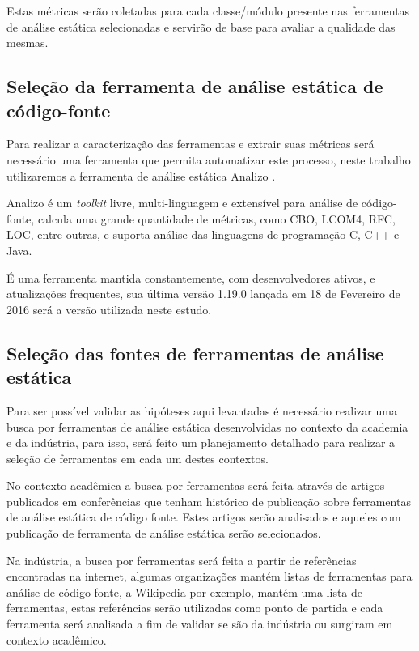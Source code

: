 \documentclass[qual, classic, a4paper]{ufbathesis}
\begin{document}
Estas métricas serão coletadas para cada classe/módulo presente nas
ferramentas de análise estática selecionadas e servirão de base para
avaliar a qualidade das mesmas.

\subsection{Seleção da ferramenta de análise estática de código-fonte}

Para realizar a caracterização das ferramentas e extrair suas métricas
será necessário uma ferramenta que permita automatizar este
processo, neste trabalho utilizaremos a ferramenta de análise estática Analizo
\cite{Terceiro2010}.

Analizo é um {\it toolkit} livre, multi-linguagem e extensível para análise de
código-fonte, calcula uma grande quantidade de métricas, como CBO, LCOM4, RFC,
LOC, entre outras, e suporta análise das linguagens de programação C, C++ e
Java.

É uma ferramenta mantida constantemente, com desenvolvedores ativos, e
atualizações frequentes, sua última versão 1.19.0 lançada em 18 de Fevereiro
de 2016 será a versão utilizada neste estudo.


\subsection{Seleção das fontes de ferramentas de análise estática}\label{levantamento}

Para ser possível validar as hipóteses aqui levantadas é necessário realizar
uma busca por ferramentas de análise estática desenvolvidas no contexto da
academia e da indústria, para isso, será feito um planejamento detalhado para
realizar a seleção de ferramentas em cada um destes contextos.

No contexto acadêmica a busca por ferramentas será feita
através de artigos publicados em conferências que tenham histórico de
publicação sobre ferramentas de análise estática de código fonte. Estes
artigos serão analisados e aqueles com publicação de ferramenta de análise
estática serão selecionados.

Na indústria, a busca por ferramentas será feita a partir
de referências encontradas na internet, algumas organizações mantém listas de
ferramentas para análise de código-fonte, a Wikipedia por exemplo, mantém uma lista
de ferramentas, estas referências serão utilizadas como ponto de partida e
cada ferramenta será analisada a fim de validar se são da indústria ou
surgiram em contexto acadêmico.
\end{document}
